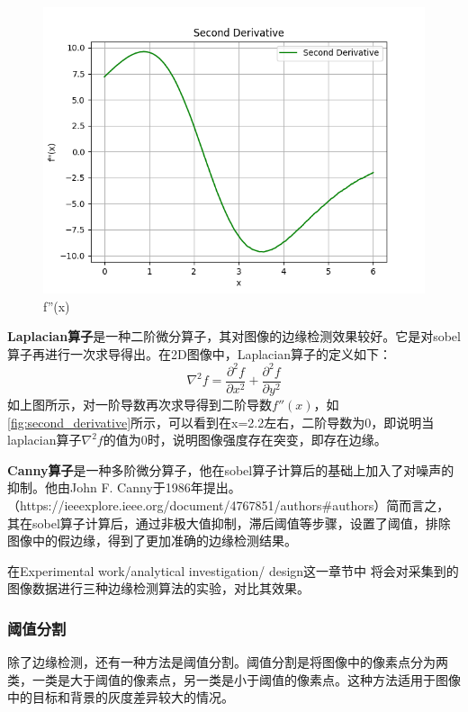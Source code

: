\begin{figure}[htbp]
\begin{minipage}[b]{0.32\textwidth}
        \centering
        \includegraphics[width=\textwidth]{./fig/second_derivative.png}
        \caption{f''(x)}
        \label{fig:second_derivative}
    \end{minipage}
\end{figure}

\textbf{Laplacian算子}是一种二阶微分算子，其对图像的边缘检测效果较好。它是对sobel算子再进行一次求导得出。在2D图像中，Laplacian算子的定义如下：
\begin{equation}
    \nabla^2 f = \frac{\partial^2 f}{\partial x^2} + \frac{\partial^2 f}{\partial y^2}
\end{equation}
如上图所示，对一阶导数再次求导得到二阶导数$f''(x)$，如\autoref{fig:second_derivative}所示，可以看到在x=2.2左右，二阶导数为0，即说明当laplacian算子$\nabla^2 f$的值为0时，说明图像强度存在突变，即存在边缘。

\textbf{Canny算子}是一种多阶微分算子，他在sobel算子计算后的基础上加入了对噪声的抑制。他由John F. Canny于1986年提出。（https://ieeexplore.ieee.org/document/4767851/authors\#authors）简而言之，其在sobel算子计算后，通过非极大值抑制，滞后阈值等步骤，设置了阈值，排除图像中的假边缘，得到了更加准确的边缘检测结果。

在Experimental work/analytical investigation/ design这一章节中 将会对采集到的图像数据进行三种边缘检测算法的实验，对比其效果。

\subsubsection{阈值分割}

除了边缘检测，还有一种方法是阈值分割。阈值分割是将图像中的像素点分为两类，一类是大于阈值的像素点，另一类是小于阈值的像素点。这种方法适用于图像中的目标和背景的灰度差异较大的情况。

